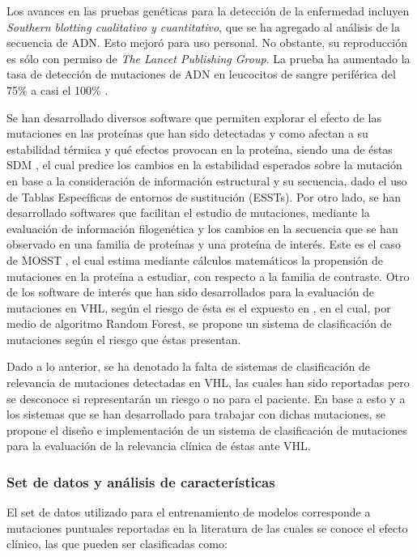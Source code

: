 Los avances en las pruebas genéticas para la detección de la enfermedad incluyen \textit{Southern blotting cualitativo y cuantitativo}, que se ha agregado al análisis de la secuencia de ADN. Esto mejoró para uso personal. No obstante, su reproducción es sólo con permiso de \textit{The Lancet Publishing Group}. La prueba ha aumentado la tasa de detección de mutaciones de ADN en leucocitos de sangre periférica del 75\% a casi el 100\% \cite{LONSER20032059}.

Se han desarrollado diversos software que permiten explorar el efecto de las mutaciones en las proteínas que han sido detectadas y como afectan a su estabilidad térmica y qué efectos provocan en la proteína, siendo una de éstas SDM \cite{Pandurangan2017}, el cual predice los cambios en la estabilidad esperados sobre la mutación en base a la consideración de información estructural y su secuencia, dado el uso de Tablas Específicas de entornos de sustitución (ESSTs). Por otro lado, se han desarrollado softwares que facilitan el estudio de mutaciones, mediante la evaluación de información filogenética y los cambios en la secuencia que se han observado en una familia de proteínas y una proteína de interés. Este es el caso de MOSST \cite{Olivera-Nappa2011}, el cual estima mediante cálculos matemáticos la propensión de mutaciones en la proteína a estudiar, con respecto a la familia de contraste. Otro de los software de interés que han sido desarrollados para la evaluación de mutaciones en VHL, según el riesgo de ésta es el expuesto en \cite{article}, en el cual, por medio de algoritmo Random Forest, se propone un sistema de clasificación de mutaciones según el riesgo que éstas presentan.

Dado a lo anterior, se ha denotado la falta de sistemas de clasificación de relevancia de mutaciones detectadas en VHL, las cuales han sido reportadas pero se desconoce si representarán un riesgo o no para el paciente. En base a esto y a los sistemas que se han desarrollado para trabajar con dichas mutaciones, se propone el diseño e implementación de un sistema de clasificación de mutaciones para la evaluación de la relevancia clínica de éstas ante VHL.	

\subsubsection{Set de datos y análisis de características}

El set de datos utilizado para el entrenamiento de modelos corresponde a mutaciones puntuales reportadas en la literatura \cite{softwareVHL, LONSER20032059, Maher443} de las cuales se conoce el efecto clínico, las que pueden ser clasificadas como:

